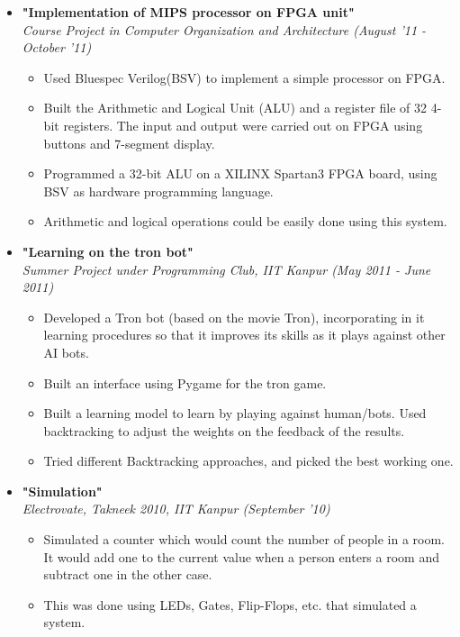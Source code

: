 \documentclass[margin,line]{resume}
\begin{document}
\begin{resume}
\begin{itemize}
  \item \large{\textbf{\textsf{"Implementation of MIPS processor on FPGA unit"}}}
    \\ \small{\textit{Course Project in Computer Organization and Architecture (August '11 - October '11)}}
    \normalsize
    \begin{itemize}
    \item Used Bluespec Verilog(BSV) to implement a simple processor on FPGA.
    \item Built the Arithmetic and Logical Unit (ALU) and a register file of 32 4-bit registers. The input and output were carried out on FPGA using buttons and 7-segment display.  
    \item Programmed a 32-bit ALU on a XILINX Spartan3 FPGA board, using BSV as hardware programming language.
    \item Arithmetic and logical operations could be easily done using this system.

    \end{itemize}

  \item \large{\textbf{\textsf{"Learning on the tron bot"}}}
    \\ \small{\textit{Summer Project under Programming Club, IIT Kanpur (May 2011 - June 2011)}}
    \normalsize
    \begin{itemize}
    \item Developed a Tron bot (based on the movie Tron), incorporating in it learning procedures so that it improves its skills as it plays against other AI bots.
    \item Built an interface using Pygame for the tron game.
    \item Built a learning model to learn by playing against human/bots. Used backtracking to adjust the weights on the feedback of the results.
    \item Tried different Backtracking approaches, and picked the best working one.
    \end{itemize}

  \item \large{\textbf{\textsf{"Simulation"}}}
    \\ \small{\textit{Electrovate, Takneek 2010, IIT Kanpur (September '10)}}
    \normalsize
    \begin{itemize}
    \item Simulated a counter which would count the number of people in a room. It would add one to the current value when a person enters a room and subtract one in the other case.
    \item This was done using LEDs, Gates, Flip-Flops, etc. that simulated a system.
    \end{itemize}


\end{itemize}
\end{resume}
\end{document}
